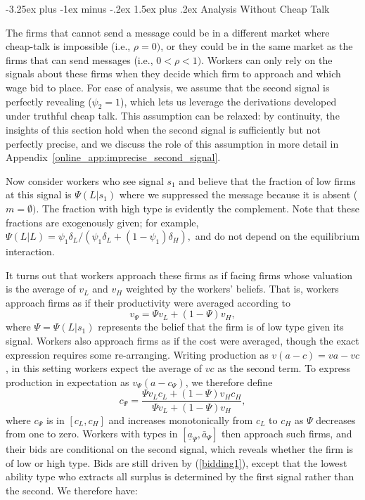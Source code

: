 \documentclass[12pt]{article}
\makeatletter
\renewcommand{\subsection}{%
  \@startsection{subsection}{2}{\z@}%
  {-3.25ex plus -1ex minus -.2ex}%
  {1.5ex plus .2ex}%
  {\normalfont\large\bfseries}%
}
\makeatother
\begin{document}
\subsection{Analysis Without Cheap Talk}

The firms that cannot send a message could
be in a different market where cheap-talk is impossible (i.e., $\rho =0)$,
or they could be in the same market as the firms that can send messages
(i.e., $0<\rho <1).$ Workers can only rely on the signals about these firms
when they decide which firm to approach and which wage bid to place. For
ease of analysis, we assume that the second signal is perfectly revealing ($\psi_{2}=1$), which lets us leverage the derivations developed under truthful cheap talk. This assumption can be relaxed: by continuity, the insights of this section hold when the second signal is sufficiently but not perfectly precise, and we discuss the role of this assumption in more detail in Appendix~\ref{online_app:imprecise_second_signal}.

Now consider workers who see signal $s_{1}$ and believe that the fraction of
low firms at this signal is $\Psi (L|s_{1})$ where we suppressed the message
because it is absent ($m=\emptyset ).$ The fraction with high type is
evidently the complement. Note that these fractions are exogenously given;
for example, $\Psi (L|L)=\psi _{1}\delta _{L}/(\psi _{1}\delta _{L}+(1-\psi
_{1})\delta _{H}),$ and do not depend on the equilibrium interaction.

It turns out that workers approach these firms as if facing firms whose valuation is the average of $v_{L}$ and $v_{H}$ weighted by the workers' beliefs. That is, workers approach firms as if their productivity were averaged according to
\begin{equation*}
v_{\Psi}=\Psi v_{L}+(1-\Psi)v_{H},
\end{equation*}%
where $\Psi=\Psi(L|s_{1})$ represents the belief that the firm is of low type given its signal. Workers also approach firms as if the cost were averaged, though the exact expression requires some re-arranging. Writing production as $v(a-c)=va-vc$, in this setting workers expect the average of $vc$ as the second term. To express production in expectation as $v_{\Psi}(a-c_{\Psi})$, we therefore define
\begin{equation*}
c_{\Psi}=\frac{\Psi v_{L}c_{L}+(1-\Psi)v_{H}c_{H}}{\Psi v_{L}+(1-\Psi)v_{H}},
\end{equation*}%
where $c_{\Psi}$ is in $[c_{L},c_{H}]$ and increases monotonically from $c_{L}$ to $c_{H}$ as $\Psi$ decreases from one to zero. Workers with types in $[\underline{a}_{\Psi},\bar{a}_{\Psi}]$ then approach such firms, and their bids are conditional on the second signal, which reveals whether the firm is of low or high type. Bids are still driven by (\ref{bidding1}), except that the lowest ability type who extracts all surplus is determined by the first signal rather than the second. We therefore have:
\end{document}
